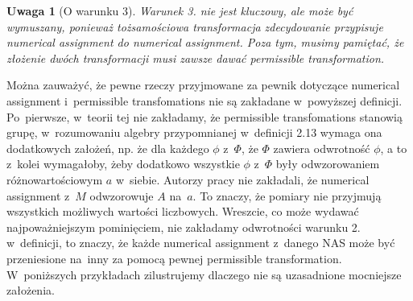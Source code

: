 \documentclass[12pt,a4paper]{report}
\newtheorem{remark}[definition]{Uwaga}
\begin{document}
\begin{remark}[O warunku 3]
Warunek 3. nie jest kluczowy, ale może być wymuszany, ponieważ tożsamościowa transformacja zdecydowanie przypisuje numerical assignment do numerical assignment. Poza tym, musimy pamiętać, że złożenie dwóch transformacji musi zawsze dawać permissible transformation.
\end{remark}

  Można zauważyć, że pewne rzeczy przyjmowane za pewnik dotyczące numerical assignment i~permissible transfomations  nie są zakładane w~powyższej definicji. Po~pierwsze, w~teorii tej nie zakładamy, że permissible transfomations stanowią grupę, w~rozumowaniu algebry przypomnianej w~definicji 2.13 wymaga ona  dodatkowych założeń, np. że dla każdego $\phi$ z~$\Phi$, że $\Phi$ zawiera odwrotność $\phi$, a to z~kolei wymagałoby, żeby dodatkowo wszystkie $\phi$ z~$\Phi$ były odwzorowaniem różnowartościowym $a$ w~siebie. Autorzy pracy {\citep{adams1965theory}} nie zakładali, że numerical assignment z~$M$ odwzorowuje $A$ na~$a$. To znaczy, że pomiary nie przyjmują wszystkich możliwych wartości liczbowych. Wreszcie, co może wydawać najpoważniejszym pominięciem, nie zakładamy odwrotności warunku 2. w~definicji, to znaczy, że każde numerical assignment z~danego NAS może być przeniesione na~inny za pomocą pewnej permissible transformation. W~poniższych przykładach zilustrujemy dlaczego nie są uzasadnione mocniejsze założenia.
\end{document}
